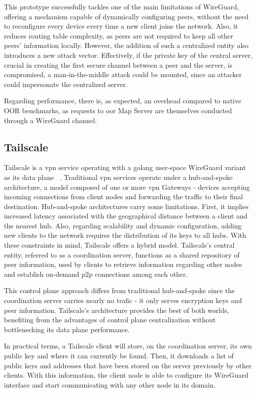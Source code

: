 \documentclass[11pt,twoside,a4paper]{report}
\begin{document}
This prototype successfully tackles one of the main limitations of WireGuard, offering a mechanism capable of dynamically configuring peers, without the need to reconfigure every device every time a new client joins the network. Also, it reduces routing table complexity, as peers are not required to keep all other peers' information locally. However, the addition of such a centralized entity also introduces a new attack vector. Effectively, if the private key of the central server, crucial in creating the first secure channel between a peer and the server, is compromised, a man-in-the-middle attack could be mounted, since an attacker could impersonate the centralized server.

Regarding performance, there is, as expected, an overhead compared to native OOR benchmarks, as requests to \ac{oor} Map Server are themselves conducted through a WireGuard channel.

\subsection{Tailscale}

Tailscale is a \ac{vpn} service operating with a golang user-space WireGuard variant as its data plane ~\cite{tailscale2020online}. Traditional \ac{vpn} services operate under a hub-and-spoke architecture, a model composed of one or more \ac{vpn} Gateways - devices accepting incoming connections from client nodes and forwarding the traffic to their final destination. Hub-and-spoke architectures carry some limitations. First, it implies increased latency associated with the geographical distance between a client and the nearest hub. Also, regarding scalability and dynamic configuration, adding new clients to the network requires the distribution of its keys to all hubs. With these constraints in mind, Tailscale offers a hybrid model. Tailscale's central entity, referred to as a coordination server, functions as a shared repository of peer information, used by clients to retrieve information regarding other nodes and establish on-demand \ac{p2p} connections among each other.

This control plane approach differs from traditional hub-and-spoke since the coordination server carries nearly no trafic - it only serves encryption keys and peer information. Tailscale's architecture provides the best of both worlds, benefiting from the advantages of control plane centralization without bottlenecking its data plane performance.

In practical terms, a Tailscale client will store, on the coordination server, its own public key and where it can currently be found. Then, it downloads a list of public keys and addresses that have been stored on the server previously by other clients. With this information, the client node is able to configure its WireGuard interface and start communicating with any other node in its domain.
\end{document}
